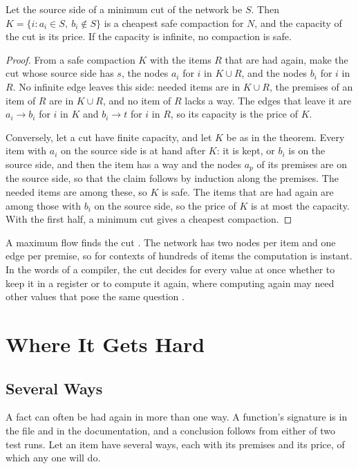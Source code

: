 \documentclass[acmsmall,nonacm,screen]{acmart}
\begin{document}
\begin{theorem}\label{thm:mincut}
Let the source side of a minimum cut of the network be $S$. Then $K = \{i : a_i \in S,\ b_i
\notin S\}$ is a cheapest safe compaction for $N$, and the capacity of the cut is its price.
If the capacity is infinite, no compaction is safe.
\end{theorem}

\begin{proof}
From a safe compaction $K$ with the items $R$ that are had again, make the cut whose source
side has $s$, the nodes $a_i$ for $i$ in $K \cup R$, and the nodes $b_i$ for $i$ in $R$. No
infinite edge leaves this side: needed items are in $K \cup R$, the premises of an item of
$R$ are in $K \cup R$, and no item of $R$ lacks a way. The edges that leave it are $a_i \to
b_i$ for $i$ in $K$ and $b_i \to t$ for $i$ in $R$, so its capacity is the price of $K$.

Conversely, let a cut have finite capacity, and let $K$ be as in the theorem. Every item
with $a_i$ on the source side is at hand after $K$: it is kept, or $b_i$ is on the source
side, and then the item has a way and the nodes $a_p$ of its premises are on the source
side, so that the claim follows by induction along the premises. The needed items are among
these, so $K$ is safe. The items that are had again are among those with $b_i$ on the
source side, so the price of $K$ is at most the capacity. With the first half, a minimum
cut gives a cheapest compaction.
\end{proof}

A maximum flow finds the cut \citep{FordFulkerson1956,EdmondsKarp1972}. The network has two
nodes per item and one edge per premise, so for contexts of hundreds of items the
computation is instant. In the words of a compiler, the cut decides for every value at once
whether to keep it in a register or to compute it again, where computing again may need
other values that pose the same question \citep{Briggs1992}.

\section{Where It Gets Hard}\label{sec:hard}

\subsection{Several Ways}

A fact can often be had again in more than one way. A function's signature is in the file
and in the documentation, and a conclusion follows from either of two test runs. Let an item
have several ways, each with its premises and its price, of which any one will do.
\end{document}
